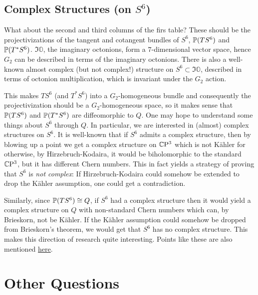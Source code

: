 \documentclass{scrartcl}
\begin{document}
\subsection{Complex Structures (on $S^6$)}

What about the second and third columns of the firs table? These should be the projectivizations of the tangent and cotangent bundles of $S^6$, $\P(TS^6)$ and $\P(T^*S^6)$. $\Im \mathbb O$, the imaginary octonions, form a $7$-dimensional vector space, hence $G_2$ can be described in terms of the imaginary octonions. There is also a well-known almost complex (but not complex!) structure on $S^6\subset \Im \mathbb O$, described in terms of octonion multiplication, which is invariant under the $G_2$ action. 

\medskip

This makes $TS^6$ (and $T^*S^6$) into a $G_2$-homogeneous bundle
and consequently the projectivization should be a $G_2$-homogeneous space, so it makes sense that $\P(TS^6)$ and $\P(T^*S^6)$ are diffeomorphic to $Q$.
One may hope to understand some things about $S^6$ through $Q$. In particular, we are interested in (almost) complex structures on $S^6$. It is well-known that if $S^6$ admits a complex structure, then by blowing up a point we get a complex structure on $\CP^3$ 
which is not K\"{a}hler for otherwise, by Hirzebruch-Kodaira,
it would be biholomorphic to the standard $\CP^3$, but it has different Chern numbers. This in fact yields a strategy of proving that $S^6$ is \emph{not complex}: If Hirzebruch-Kodaira could somehow be extended to drop the K\"{a}hler assumption, one could get a contradiction. 

\medskip

Similarly, since $\P(TS^6)\cong Q$, if $S^6$ had a complex structure then it would yield a complex structure on $Q$ with non-standard Chern numbers which can, by Brieskorn, not be K\"{a}hler. If the K\"{a}hler assumption could somehow be dropped from Brieskorn's theorem, we would get that $S^6$ has no complex structure. This makes this direction of research quite interesting. Points like these are also mentioned \href{http://mathoverflow.net/a/1984/52890}{here}.

\section{Other Questions}
\end{document}
